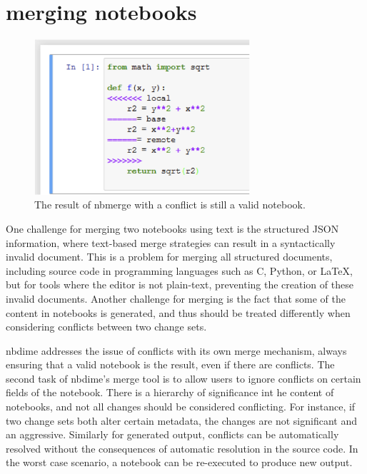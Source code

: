 \documentclass{../../Proposal/Latex-Proposal/deliverablereport}
\begin{document}

\section{merging notebooks} %
\label{sec:merging_notebooks}

\begin{figure}
    \center
    \includegraphics[width=8cm]{img/nbmerge}
    \caption{The result of nbmerge with a conflict is still a valid notebook.}
    \label{fig:nbmerge}
\end{figure}

One challenge for merging two notebooks using text is the structured JSON information, where
text-based merge strategies can result in a syntactically invalid document. This is a problem for
merging all structured documents, including source code in programming languages such as C, Python,
or \LaTeX, but for tools where the editor is not plain-text, preventing the creation of these
invalid documents. Another challenge for merging is the fact that some of the content in notebooks
is generated, and thus should be treated differently when considering conflicts between two change
sets.

nbdime addresses the issue of conflicts with its own merge mechanism, always ensuring that a valid notebook is the result, even if there are conflicts.
The second task of nbdime's merge tool is to allow users to ignore conflicts on certain fields of the notebook.
There is a hierarchy of significance int he content of notebooks,
and not all changes should be considered conflicting.
For instance, if two change sets both alter certain metadata,
the changes are not significant and an aggressive.
Similarly for generated output, conflicts can be automatically resolved without the consequences of automatic resolution in the source code.
In the worst case scenario, a notebook can be re-executed to produce new output.
\end{document}
